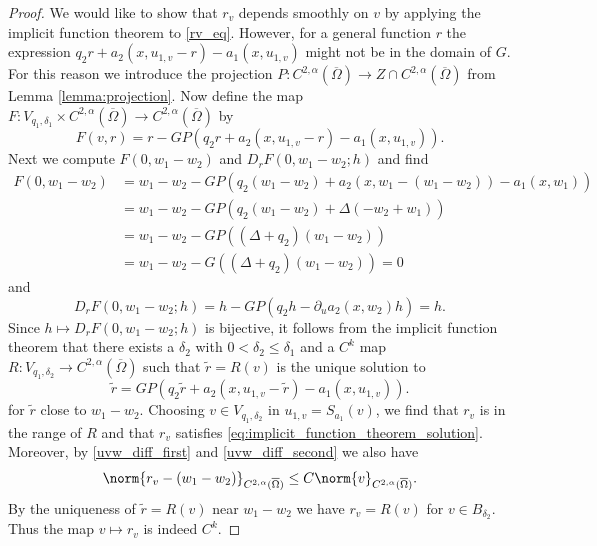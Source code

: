 \documentclass[11pt,a4paper]{amsart}
\theoremstyle{definition}
\numberwithin{equation}{section}
\newcommand{\ol}[1]{\overline{#1}}
\newcommand{\p}{\partial}
\newcommand{\Om}{\Omega}
\begin{document}
\begin{proof}
We would like to show that $r_v$ depends smoothly on $v$ by applying the implicit function theorem to \eqref{rv_eq}.
However, for a general function $r$ the expression $q_2r + a_2(x,u_{1,v} - r) - a_1(x,u_{1,v})$ might not be in the domain of $G$.
For this reason we introduce the projection $P\colon C^{2,\alpha}(\ol{\Om})\to Z\cap C^{2,\alpha}(\ol{\Om})$ from Lemma \ref{lemma:projection}.
Now define the map $F\colon V_{q_1,\delta_1}\times C^{2,\alpha}(\ol{\Om})\to C^{2,\alpha}(\ol{\Om})$ by
\begin{equation*}
	F(v,r) = r - GP(q_2r + a_2(x,u_{1,v} - r) - a_1(x,u_{1,v})).
\end{equation*}
Next we compute $F(0,w_1-w_2)$ and $D_rF(0,w_1-w_2;h)$ and find
\begin{align*}
	F(0,w_1-w_2) &= w_1-w_2 - GP(q_2(w_1-w_2)+a_2(x,w_1-(w_1-w_2)) - a_1(x,w_1)) \\
	&= w_1-w_2- GP(q_2(w_1-w_2) + \Delta(-w_2 + w_1)) \\
	&= w_1-w_2- GP((\Delta+q_2)(w_1-w_2)) \\
	&= w_1-w_2- G((\Delta+q_2)(w_1 - w_2)) = 0
\end{align*}
and
\begin{equation*}
	D_rF(0,w_1-w_2;h) = h - GP(q_2h - \p_ua_2(x,w_2)h) = h.
\end{equation*}
Since $h\mapsto D_rF(0,w_1-w_2;h)$ is bijective, it follows from the implicit function theorem \cite[Theorem 4]{hg27} that there exists a $\delta_2$ with $0<\delta_2 \leq \delta_1$ and a $C^k$ map $R\colon V_{q_1,\delta_2}\to C^{2,\alpha}(\ol{\Om})$ such that $\tilde{r} = R(v)$ is the unique solution to
\begin{equation}\label{eq:implicit_function_theorem_solution}
	\tilde{r} = GP(q_2\tilde{r} + a_2(x,u_{1,v} - \tilde{r}) - a_1(x,u_{1,v})).
\end{equation}
for $\tilde{r}$ close to $w_1-w_2$. Choosing $v\in V_{q_1,\delta_2}$ in $u_{1,v} = S_{a_1}(v)$, we find that $r_v$ is in the range of $R$ and that $r_v$ satisfies \eqref{eq:implicit_function_theorem_solution}. Moreover, by \eqref{uvw_diff_first} and \eqref{uvw_diff_second} we also have 
\[
\norm{r_v - (w_1-w_2)}_{C^{2,\alpha}(\ol{\Om})} \leq C \norm{v}_{C^{2,\alpha}(\ol{\Om})}.
\]
By the uniqueness of $\tilde{r} = R(v)$ near $w_1-w_2$ we have $r_v = R(v)$ for $v\in B_{\delta_2}$. Thus the map $v\mapsto r_v$ is indeed $C^k$.


\end{proof}
\end{document}

